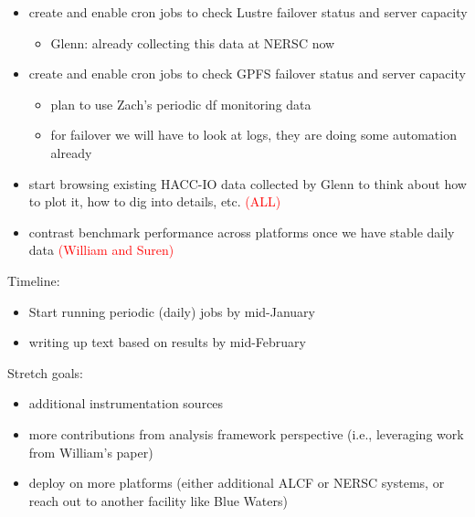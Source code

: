\documentclass[conference,10pt,compsocconf]{IEEEtran}
\newcommand{\assign}[1]{\textcolor{red}{(#1)}}
\begin{document}
\begin{itemize}
\item create and enable cron jobs to check Lustre failover status and server
capacity
\begin{itemize}
\item Glenn: already collecting this data at NERSC now
\end{itemize}

\item create and enable cron jobs to check GPFS failover status and server
capacity
\begin{itemize}
\item plan to use Zach's periodic df monitoring data
\item for failover we will have to look at logs, they are doing some
automation already
\end{itemize}

\item start browsing existing HACC-IO data collected by Glenn to think about
how to plot it, how to dig into details, etc. \assign{ALL}
    
\item contrast benchmark performance across platforms once we have stable
daily data \assign{William and Suren}
\end{itemize}

Timeline:
\begin{itemize}
\item Start running periodic (daily) jobs by mid-January
\item writing up text based on results by mid-February
\end{itemize}

Stretch goals:
\begin{itemize}
\item additional instrumentation sources
\item more contributions from analysis framework perspective (i.e.,
leveraging work from William's paper) 
\item deploy on more platforms (either additional ALCF or NERSC systems, or
reach out to another facility like Blue Waters)
\end{itemize}



\end{document}
